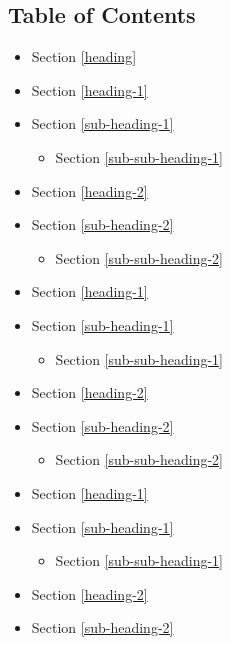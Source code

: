 \documentclass[11pt]{article}
\providecommand{\tightlist}{%
      \setlength{\itemsep}{0pt}\setlength{\parskip}{0pt}}
\begin{document}
    \subsection{Table of Contents}\label{table-of-contents}

    \begin{itemize}
\item
  Section \ref{heading}
\item
  Section \ref{heading-1}
\item
  Section \ref{sub-heading-1}

  \begin{itemize}
  \tightlist
  \item
    Section \ref{sub-sub-heading-1}
  \end{itemize}
\item
  Section \ref{heading-2}
\item
  Section \ref{sub-heading-2}

  \begin{itemize}
  \tightlist
  \item
    Section \ref{sub-sub-heading-2}
  \end{itemize}
\item
  Section \ref{heading-1}
\item
  Section \ref{sub-heading-1}

  \begin{itemize}
  \tightlist
  \item
    Section \ref{sub-sub-heading-1}
  \end{itemize}
\item
  Section \ref{heading-2}
\item
  Section \ref{sub-heading-2}

  \begin{itemize}
  \tightlist
  \item
    Section \ref{sub-sub-heading-2}\\
  \end{itemize}
\item
  Section \ref{heading-1}
\item
  Section \ref{sub-heading-1}

  \begin{itemize}
  \tightlist
  \item
    Section \ref{sub-sub-heading-1}
  \end{itemize}
\item
  Section \ref{heading-2}
\item
  Section \ref{sub-heading-2}


\end{itemize}
\end{document}
